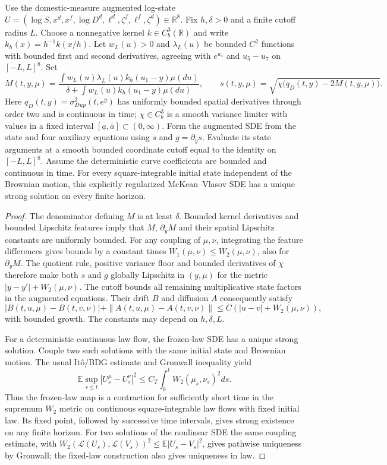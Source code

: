 \begin{prop}
\label{prop: regularizedExistence}
Use the domestic-measure augmented log-state
$U=(\log S,x^d,x^f,\log D^d,\ell^d,\zeta^f,\ell^f,\zeta^d)\in\mathbb R^8$.
Fix $h,\delta>0$ and a finite cutoff radius $L$. Choose a nonnegative kernel
$k\in C_b^3(\mathbb R)$ and write $k_h(x)=h^{-1}k(x/h)$.
Let $w_L(u)>0$ and $\lambda_L(u)$ be bounded $C^2$ functions with bounded
first and second derivatives, agreeing with $e^{u_4}$ and $u_5-u_7$ on
$[-L,L]^8$. Set
\[
M(t,y,\mu)=\frac{\int w_L(u)\lambda_L(u)k_h(u_1-y)\mu(du)}
 {\delta+\int w_L(u)k_h(u_1-y)\mu(du)},\qquad
s(t,y,\mu)=\sqrt{\chi\big(q_D(t,y)-2M(t,y,\mu)\big)}.
\]
Here $q_D(t,y)=\sigma_{Dup}^2(t,e^y)$ has uniformly bounded spatial
derivatives through order two and is continuous in time; $\chi\in C_b^3$
is a smooth variance limiter with values in a fixed interval
$[\underline a,\overline a]\subset(0,\infty)$.
Form the augmented SDE from the state and four auxiliary equations using
$s$ and $g=\partial_y s$. Evaluate its state arguments at a smooth bounded
coordinate cutoff equal to the identity on $[-L,L]^8$. Assume the
deterministic curve coefficients are bounded and continuous in time.
For every square-integrable initial state independent of the Brownian motion,
this explicitly regularized McKean--Vlasov SDE has a unique strong solution
on every finite horizon.
\end{prop}
\begin{proof}
The denominator defining $M$ is at least $\delta$. Bounded kernel derivatives
and bounded Lipschitz features imply that $M$, $\partial_yM$ and their
spatial Lipschitz constants are uniformly bounded. For any coupling of
$\mu,\nu$, integrating the feature differences gives bounds by a constant
times $W_1(\mu,\nu)\leq W_2(\mu,\nu)$, also for $\partial_yM$.
The quotient rule, positive variance floor and bounded derivatives of $\chi$
therefore make both $s$ and $g$ globally Lipschitz in $(y,\mu)$ for the
metric $|y-y'|+W_2(\mu,\nu)$. The cutoff bounds all remaining multiplicative
state factors in the augmented equations. Their drift $B$ and diffusion
$A$ consequently satisfy
\[
|B(t,u,\mu)-B(t,v,\nu)|+\|A(t,u,\mu)-A(t,v,\nu)\|
\leq C(|u-v|+W_2(\mu,\nu)),
\]
with bounded growth. The constants may depend on $h,\delta,L$.

For a deterministic continuous law flow, the frozen-law SDE has a unique
strong solution. Couple two such solutions with the same initial state and
Brownian motion. The usual It\^o/BDG estimate and Gronwall inequality yield
\[
\mathbb E\sup_{s\leq t}|U_s^\mu-U_s^\nu|^2
\leq C_T\int_0^t W_2(\mu_s,\nu_s)^2ds.
\]
Thus the frozen-law map is a contraction for sufficiently short time in the
supremum $W_2$ metric on continuous square-integrable law flows with fixed
initial law. Its fixed point, followed by successive time intervals, gives
strong existence on any finite horizon. For two solutions of the nonlinear
SDE the same coupling estimate, with
$W_2(\mathcal L(U_s),\mathcal L(V_s))^2\leq\mathbb E|U_s-V_s|^2$,
gives pathwise uniqueness by Gronwall; the fixed-law construction also gives
uniqueness in law.
\end{proof}
